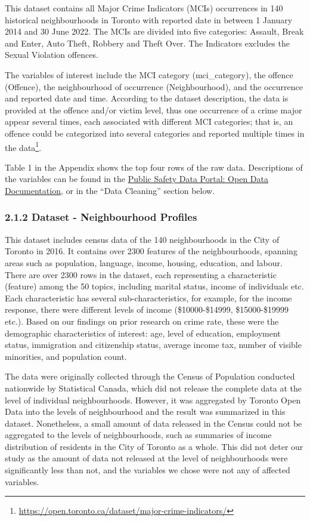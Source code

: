 \documentclass[
]{article}
\begin{document}
This dataset contains all Major Crime Indicators (MCIs) occurrences in
140 historical neighbourhoods in Toronto with reported date in between 1
January 2014 and 30 June 2022. The MCIs are divided into five
categories: Assault, Break and Enter, Auto Theft, Robbery and Theft
Over. The Indicators excludes the Sexual Violation offences.

The variables of interest include the MCI category (mci\_category), the
offence (Offence), the neighbourhood of occurrence (Neighbourhood), and
the occurrence and reported date and time. According to the dataset
description, the data is provided at the offence and/or victim level,
thus one occurrence of a crime major appear several times, each
associated with different MCI categories; that is, an offence could be
categorized into several categories and reported multiple times in the
data\footnote{\url{https://open.toronto.ca/dataset/major-crime-indicators/}}.

Table 1 in the Appendix shows the top four rows of the raw data.
Descriptions of the variables can be found in the
\href{https://torontops.maps.arcgis.com/sharing/rest/content/items/c0b17f1888544078bf650f3b8b04d35d/data}{Public
Safety Data Portal: Open Data Documentation}, or in the ``Data
Cleaning'' section below.

\hypertarget{dataset---neighbourhood-profiles}{%
\subsubsection{2.1.2 Dataset - Neighbourhood
Profiles}\label{dataset---neighbourhood-profiles}}

This dataset includes census data of the 140 neighbourhoods in the City
of Toronto in 2016. It contains over 2300 features of the
neighbourhoods, spanning areas such as population, language, income,
housing, education, and labour. There are over 2300 rows in the dataset,
each representing a characteristic (feature) among the 50 topics,
including marital status, income of individuals etc. Each characteristic
has several sub-characteristics, for example, for the income response,
there were different levels of income (\$10000-\$14999, \$15000-\$19999
etc.). Based on our findings on prior research on crime rate, these were
the demographic characteristics of interest: age, level of education,
employment status, immigration and citizenship status, average income
tax, number of visible minorities, and population count.

The data were originally collected through the Census of Population
conducted nationwide by Statistical Canada, which did not release the
complete data at the level of individual neighbourhoods. However, it was
aggregated by Toronto Open Data into the levels of neighbourhood and the
result was summarized in this dataset. Nonetheless, a small amount of
data released in the Census could not be aggregated to the levels of
neighbourhoods, such as summaries of income distribution of residents in
the City of Toronto as a whole. This did not deter our study as the
amount of data not released at the level of neighbourhoods were
significantly less than not, and the variables we chose were not any of
affected variables.
\end{document}
